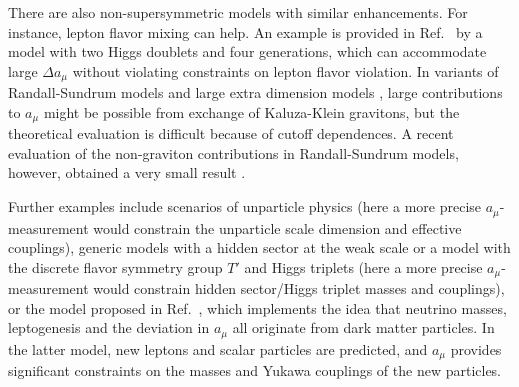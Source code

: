 \begin{itemize}
There are also non-supersymmetric models with similar
enhancements. For instance, lepton flavor mixing can help. An example
is provided in Ref.\ \cite{BarShalom:2011bb} by a model with two Higgs
doublets and four generations, which can accommodate large
$\Delta a_\mu$ without violating constraints on lepton flavor
violation. In variants of Randall-Sundrum models
\cite{Davoudiasl:2000my,Park:2001uc,Kim:2001rc} and large
extra dimension models \cite{Graesser:1999yg}, large
contributions to $a_\mu$ might be possible from exchange of
Kaluza-Klein gravitons, but the theoretical evaluation
is difficult because of cutoff dependences. A recent evaluation of the
non-graviton contributions in Randall-Sundrum models, however,
obtained a very small result \cite{Beneke:2012ie}. 



Further examples
include scenarios of unparticle physics
\cite{Cheung:2007zza,Conley:2008jg} (here a more precise
$a_\mu$-measurement would constrain the unparticle scale dimension and
effective couplings), generic models with a hidden sector at the weak
scale \cite{McKeen:2009ny} or a model with the discrete flavor 
symmetry group $T'$ and Higgs triplets \cite{Ho:2010yp} (here
a more precise $a_\mu$-measurement would constrain hidden sector/Higgs
triplet masses and couplings), or the model proposed in
Ref.\ \cite{Hambye:2006zn}, which implements the idea that neutrino
masses, leptogenesis and the deviation in $a_\mu$ all originate from
dark matter particles. In the latter model, new leptons and scalar
particles are predicted, and $a_\mu$ provides significant constraints
on the masses and Yukawa couplings of the new particles.
\end{itemize}


